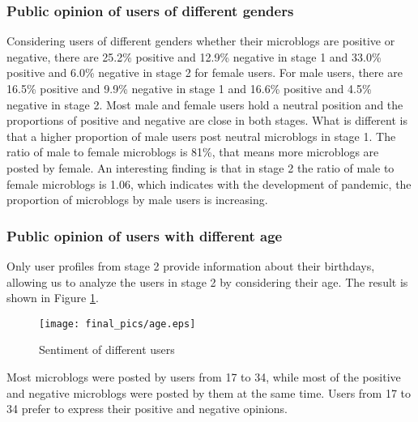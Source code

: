\documentclass[sigconf, nonacm=true]{acmart}
\begin{document}
\subsubsection{Public opinion of users of different genders}
Considering users of different genders whether their microblogs are positive or negative, there are 25.2\% positive and 12.9\% negative in stage 1 and 33.0\% positive and 6.0\% negative in stage 2 for female users.
For male users, there are 16.5\% positive and 9.9\% negative in stage 1 and 16.6\% positive and 4.5\% negative in stage 2.
Most male and female users hold a neutral position and the proportions of positive and negative are close in both stages.
What is different is that a higher proportion of male users post neutral microblogs in stage 1.
The ratio of male to female microblogs is 81\%, that means more microblogs are posted by female.
An interesting finding is that in stage 2 the ratio of male to female microblogs is 1.06, which indicates with the development of pandemic, the proportion of microblogs by male users is increasing.
\vspace{-0.2cm}
\subsubsection{Public opinion of users with different age}
Only user profiles from stage 2 provide information about their birthdays, allowing us to analyze the users in stage 2 by considering their age. The result is shown in Figure \ref{figure:age}.
\begin{figure}[t]
  \texttt{[image: final\_pics/age.eps]}
  \vspace{-0.3cm}
  \caption{Sentiment of different users}
  \vspace{-0.3cm}
  \label{figure:age}
\end{figure}
Most microblogs were posted by users from 17 to 34, while most of the positive and negative microblogs were posted by them at the same time.
Users from 17 to 34 prefer to express their positive and negative opinions.
\vspace{-0.2cm}
\end{document}

